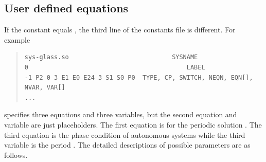\documentclass[10pt,a4paper]{ddedoc}
\begin{document}
\subsection{User defined equations}
If the  constant equals , the third line of the constants file is different. For example
{ \small \begin{quote} \begin{lstlisting}[basicstyle=\tt,frame=single]
sys-glass.so							SYSNAME
0											LABEL
-1 P2 0 3 E1 E0 E24 3 S1 S0 P0	TYPE, CP, SWITCH, NEQN, EQN[], NVAR, VAR[]
...
\end{lstlisting} \end{quote} } \noindent
specifies three equations and three variables, but the second equation and variable are just placeholders. The first equation  is for the periodic solution . The third equation  is the phase condition of autonomous systems while the third variable is the period . The detailed descriptions of possible parameters are as follows.
\end{document}
